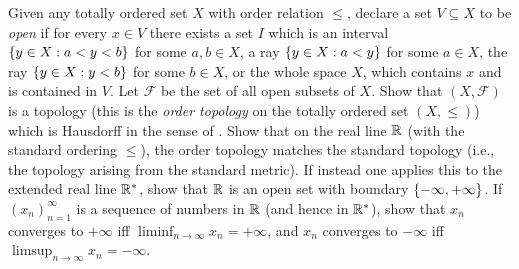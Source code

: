 \begin{ex}\label{ii:ex:2.5.5}
  Given any totally ordered set \(X\) with order relation \(\leq\), declare a set \(V \subseteq X\) to be \emph{open} if for every \(x \in V\) there exists a set \(I\) which is an interval \(\left\lbrace y \in X : a < y < b\right\rbrace\) for some \(a, b \in X\), a ray \(\left\lbrace y \in X : a < y\right\rbrace\) for some \(a \in X\), the ray \(\left\lbrace y \in X : y < b\right\rbrace\) for some \(b \in X\), or the whole space \(X\), which contains \(x\) and is contained in \(V\).
  Let \(\mathcal{F}\) be the set of all open subsets of \(X\).
  Show that \((X, \mathcal{F})\) is a topology (this is the \emph{order topology} on the totally ordered set \((X, \leq)\)) which is Hausdorff in the sense of .
  Show that on the real line \(\mathbb{R}\) (with the standard ordering \(\leq\)), the order topology matches the standard topology (i.e., the topology arising from the standard metric).
  If instead one applies this to the extended real line \(\mathbb{R}^*\), show that \(\mathbb{R}\) is an open set with boundary \(\left\lbrace-\infty, +\infty\right\rbrace\).
  If \((x_n)_{n = 1}^\infty\) is a sequence of numbers in \(\mathbb{R}\) (and hence in \(\mathbb{R}^*\)), show that \(x_n\) converges to \(+\infty\) iff \(\liminf_{n \to \infty} x_n = +\infty\), and \(x_n\) converges to \(-\infty\) iff \(\limsup_{n \to \infty} x_n = -\infty\).
\end{ex}

